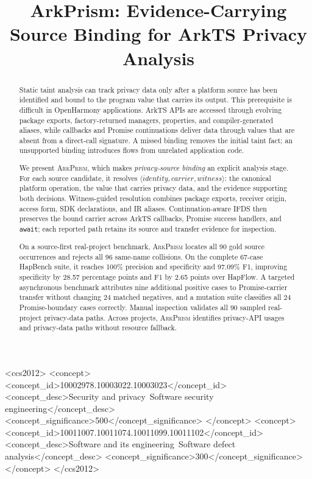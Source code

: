 \documentclass[acmsmall,screen,review,anonymous]{acmart}
\newcommand{\mytoolname}{\textsc{ArkPrism}}
\newcommand{\mytool}{\mytoolname\xspace}
\newcommand{\mytooltitle}{\texorpdfstring{ArkPrism: Evidence-Carrying Source Binding for ArkTS Privacy Analysis}{ArkPrism: Evidence-Carrying Source Binding for ArkTS Privacy Analysis}}
\newcommand{\openharmony}{OpenHarmony\xspace}
\begin{document}
\sloppy

\title{\mytooltitle}

\begin{abstract}
Static taint analysis can track privacy data only after a platform source has been identified and bound to the program value that carries its output. This prerequisite is difficult in \openharmony applications. ArkTS APIs are accessed through evolving package exports, factory-returned managers, properties, and compiler-generated aliases, while callbacks and Promise continuations deliver data through values that are absent from a direct-call signature. A missed binding removes the initial taint fact; an unsupported binding introduces flows from unrelated application code.

We present \mytool, which makes \emph{privacy-source binding} an explicit analysis stage. For each source candidate, it resolves $\langle identity, carrier, witness\rangle$: the canonical platform operation, the value that carries privacy data, and the evidence supporting both decisions. Witness-guided resolution combines package exports, receiver origin, access form, SDK declarations, and IR aliases. Continuation-aware IFDS then preserves the bound carrier across ArkTS callbacks, Promise success handlers, and \texttt{await}; each reported path retains its source and transfer evidence for inspection.

On a source-first real-project benchmark, \mytool locates all 90 gold source occurrences and rejects all 96 same-name collisions. On the complete 67-case HapBench suite, it reaches 100\% precision and specificity and 97.09\% F1, improving specificity by 28.57 percentage points and F1 by 2.65 points over HapFlow. A targeted asynchronous benchmark attributes nine additional positive cases to Promise-carrier transfer without changing 24 matched negatives, and a mutation suite classifies all 24 Promise-boundary cases correctly. Manual inspection validates all 90 sampled real-project privacy-data paths. Across \CorpusProjects{} projects, \mytool identifies \CorpusApiOccurrences{} privacy-API usages and \CorpusPrivacyPaths{} privacy-data paths without resource fallback.
\end{abstract}

\begin{CCSXML}
<ccs2012>
   <concept>
       <concept_id>10002978.10003022.10003023</concept_id>
       <concept_desc>Security and privacy~Software security engineering</concept_desc>
       <concept_significance>500</concept_significance>
   </concept>
   <concept>
       <concept_id>10011007.10011074.10011099.10011102</concept_id>
       <concept_desc>Software and its engineering~Software defect analysis</concept_desc>
       <concept_significance>300</concept_significance>
   </concept>
</ccs2012>
\end{CCSXML}
\end{document}
